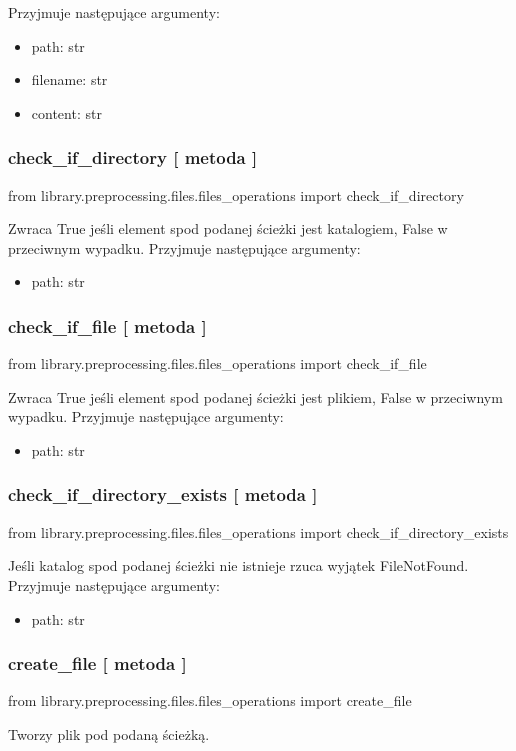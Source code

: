 Przyjmuje następujące argumenty:
\begin{itemize}
	\item path: str
	\item filename: str
	\item content: str
\end{itemize}

\subsubsection{check\_if\_directory [ metoda ] }
\begin{import}
from library.preprocessing.files.files_operations import check_if_directory
\end{import}
Zwraca True jeśli element spod podanej ścieżki jest katalogiem, False w przeciwnym wypadku.
Przyjmuje następujące argumenty:
\begin{itemize}
	\item path: str
\end{itemize}

\subsubsection{check\_if\_file [ metoda ] }
\begin{import}
from library.preprocessing.files.files_operations import check_if_file
\end{import}
Zwraca True jeśli element spod podanej ścieżki jest plikiem, False w przeciwnym wypadku.
Przyjmuje następujące argumenty:
\begin{itemize}
	\item path: str
\end{itemize}

\subsubsection{check\_if\_directory\_exists [ metoda ] }
\begin{import}
from library.preprocessing.files.files_operations import check_if_directory_exists
\end{import}
Jeśli katalog spod podanej ścieżki nie istnieje rzuca wyjątek FileNotFound.
Przyjmuje następujące argumenty:
\begin{itemize}
	\item path: str
\end{itemize}

\subsubsection{create\_file [ metoda ] }
\begin{import}
from library.preprocessing.files.files_operations import create_file
\end{import}
Tworzy plik pod podaną ścieżką. 

